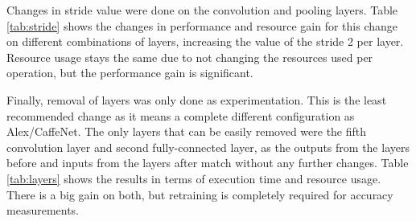\begin{enumerate}
Changes in stride value were done on the convolution and pooling layers. Table \ref{tab:stride}
shows the changes in performance and resource gain for this change on different combinations of
layers, increasing the value of the stride 2 per layer. Resource usage stays the same due 
to not changing the resources used per operation, but
the performance gain is significant.

\begin{table}[H]
    \begin{center}
        \caption{Execution time and resource usage for different stride values.}
            \label{tab:stride}
    \end{center}
\end{table}

Finally, removal of layers was only done as experimentation. This is the least recommended change as
it means a complete different configuration as Alex/CaffeNet. The only layers that can
be easily removed were the fifth convolution layer and second fully-connected layer, as the
outputs from the layers before and inputs from the layers after match without any further changes.
Table \ref{tab:layers} shows the results in terms of execution time and resource usage. There is
a big gain on both, but retraining is completely required for accuracy measurements.


\end{enumerate}
